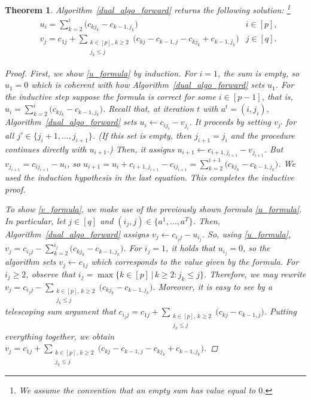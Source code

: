 \documentclass[letterpaper]{article}
\newtheorem{theorem}{Theorem}[section]
\begin{document}
\begin{theorem}\label{theorem_u_v_formulas}
    Algorithm~\ref{dual_algo_forward} returns the following solution: \footnote{We assume the convention that an empty sum has value equal to $0$.}
    \begin{align}
        &u_i = \sum_{k=2}^{i} \bigl( c_{k j_k} - c_{k-1, j_k} \bigr) &i \in [p], \label{u_formula} \\
        &v_j = c_{1j} + \sum_{\substack{k \in [p], \, k \geq 2 \\ j_k \leq j}} \bigl( c_{kj} - c_{k-1, j} - c_{k j_k} + c_{k-1, j_k} \bigr) &j \in [q]. \label{v_formula}
    \end{align}
    \begin{proof}
        First, we show \eqref{u_formula} by induction. For $i = 1$, the sum is empty, so $u_1 = 0$ which is coherent with how Algorithm~\ref{dual_algo_forward} sets $u_1$. For the inductive step suppose the formula is correct for some $i \in [p-1]$, that is, $u_i = \sum_{k=2}^{i} \bigl( c_{k j_k} - c_{k-1, j_k} \bigr)$. Recall that, at iteration $t$ with $a^t = (i, j_i)$, Algorithm~\ref{dual_algo_forward} sets $u_{i} \gets c_{i j_i} - v_{j_i}$. It proceeds by setting $v_{j'}$ for all $j' \in \{j_i+1, \dots, j_{i+1}\}$. (If this set is empty, then $j_{i+1} = j_i$ and the procedure continues directly with $u_{i+1}$.) Then, it assigns $u_{i+1} \gets c_{i+1, j_{i+1}} - v_{j_{i+1}}$. But $v_{j_{i+1}} = c_{i j_{i+1}} - u_i$, so $u_{i+1} = u_i + c_{i+1, j_{i+1}} - c_{i j_{i+1}} = \sum_{k = 2}^{i+1} \bigl( c_{k j_k} - c_{k-1, j_k} \bigr)$. We used the induction hypothesis in the last equation. This completes the inductive proof.

        To show \eqref{v_formula}, we make use of the previously shown formula \eqref{u_formula}. In particular, let $j \in [q]$ and $(i_j,j) \in \{a^1, \dots, a^T\}$. Then, Algorithm~\ref{dual_algo_forward} assigns $v_j \gets c_{i_j j} - u_{i_j}$. So, using \eqref{u_formula}, $v_j = c_{i_j j} - \sum_{k=2}^{i_j} \bigl( c_{k j_k} - c_{k-1, j_k} \bigr)$. For $i_j = 1$, it holds that $u_{i_j} = 0$, so the algorithm sets $v_j \gets c_{1j}$ which corresponds to the value given by the formula. For $i_j \geq 2$, observe that $i_j = \max \{k \in [p] \, | \, k \geq 2: j_k \leq j\}$. Therefore, we may rewrite $v_j = c_{i_j j} - \sum_{\substack{k \in [p], \, k \geq 2 \\ j_k \leq j}} \bigl( c_{k j_k} - c_{k-1, j_k} \bigr)$. Moreover, it is easy to see by a telescoping sum argument that $c_{i_j j} = c_{1j} + \sum_{\substack{k \in [p], \, k \geq 2 \\ j_k \leq j}} \bigl( c_{k j} - c_{k-1, j} \bigr)$. Putting everything together, we obtain $v_j = c_{1j} + \sum_{\substack{k \in [p], \, k \geq 2 \\ j_k \leq j}} \bigl( c_{kj} - c_{k-1, j} - c_{k j_k} + c_{k-1, j_k} \bigr)$.
    \end{proof}
\end{theorem}
\end{document}
